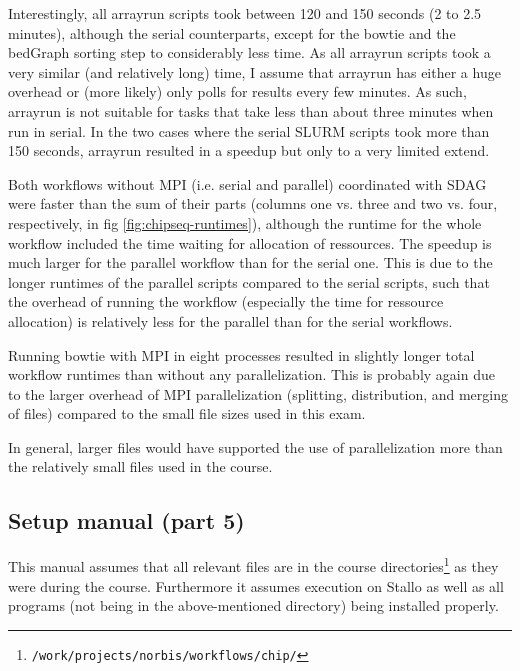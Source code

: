 \documentclass[paper=a4, 12pt]{scrartcl}
\begin{document}
Interestingly, all arrayrun scripts took between 120 and 150 seconds (2 to 2.5 minutes), although the serial counterparts, except for the bowtie and the bedGraph sorting step to considerably less time. As all arrayrun scripts took a very similar (and relatively long) time, I assume that arrayrun has either a huge overhead or (more likely) only polls for results every few minutes. As such, arrayrun is not suitable for tasks that take less than about three minutes when run in serial. In the two cases where the serial SLURM scripts took more than 150 seconds, arrayrun resulted in a speedup but only to a very limited extend.

Both workflows without MPI (i.e. serial and parallel) coordinated with SDAG were faster than the sum of their parts (columns one vs. three and two vs. four, respectively, in fig \ref{fig:chipseq-runtimes}), although the runtime for the whole workflow included the time waiting for allocation of ressources. The speedup is much larger for the parallel workflow than for the serial one. This is due to the longer runtimes of the parallel scripts compared to the serial scripts, such that the overhead of running the workflow (especially the time for ressource allocation) is relatively less for the parallel than for the serial workflows.

Running bowtie with MPI in eight processes resulted in slightly longer total workflow runtimes than without any parallelization. This is probably again due to the larger overhead of MPI parallelization (splitting, distribution, and merging of files) compared to the small file sizes used in this exam.

In general, larger files would have supported the use of parallelization more than the relatively small files used in the course.

\subsection{Setup manual (part 5)}

This manual assumes that all relevant files are in the course directories\footnote{\texttt{/work/}\allowbreak\texttt{projects/}\texttt{norbis/}\allowbreak\texttt{workflows/}\allowbreak\texttt{chip/}} as they were during the course. Furthermore it assumes execution on Stallo as well as all programs (not being in the above-mentioned directory) being installed properly.
\end{document}
